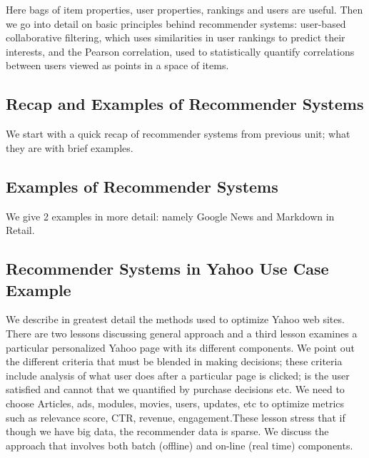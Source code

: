 Here bags of item properties, user properties, rankings and users are
useful. Then we go into detail on basic principles behind recommender
systems: user-based collaborative filtering, which uses similarities in
user rankings to predict their interests, and the Pearson correlation,
used to statistically quantify correlations between users viewed as
points in a space of items.



\subsection{Recap and Examples of Recommender
Systems}\label{recap-and-examples-of-recommender-systems}

We start with a quick recap of recommender systems from previous unit;
what they are with brief examples.



\subsection{Examples of Recommender
Systems}\label{examples-of-recommender-systems-1}

We give 2 examples in more detail: namely Google News and Markdown in
Retail.



\subsection{Recommender Systems in Yahoo Use Case
Example}\label{recommender-systems-in-yahoo-use-case-example}

We describe in greatest detail the methods used to optimize Yahoo web
sites. There are two lessons discussing general approach and a third
lesson examines a particular personalized Yahoo page with its different
components. We point out the different criteria that must be blended in
making decisions; these criteria include analysis of what user does
after a particular page is clicked; is the user satisfied and cannot
that we quantified by purchase decisions etc. We need to choose
Articles, ads, modules, movies, users, updates, etc to optimize metrics
such as relevance score, CTR, revenue, engagement.These lesson stress
that if though we have big data, the recommender data is sparse. We
discuss the approach that involves both batch (offline) and on-line
(real time) components.

